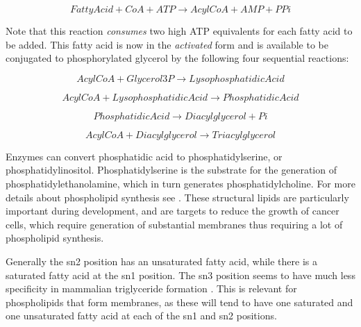 \documentclass{tufte-handout}
\begin{document}
\begin{equation}
Fatty Acid + CoA +  ATP \rightarrow AcylCoA + AMP + PPi
\end{equation}

Note that this reaction \emph{consumes} two high ATP equivalents for each fatty acid to be added.  This fatty acid is now in the \emph{activated} form and is available to be conjugated to phosphorylated glycerol by the following four sequential reactions:

\begin{equation}\label{eq:gpat}
AcylCoA + Glycerol3P \rightarrow Lysophosphatidic Acid
\end{equation}

\begin{equation}\label{eq:agpat}
AcylCoA+ Lysophosphatidic Acid \rightarrow Phosphatidic Acid
\end{equation}

\begin{equation}\label{eq:lipin}
Phosphatidic Acid \rightarrow Diacylglycerol + Pi
\end{equation}

\begin{equation}\label{eq:dgat}
AcylCoA + Diacylglycerol \rightarrow Triacylglycerol
\end{equation}

  Enzymes can convert phosphatidic acid to phosphatidylserine, or phosphatidylinositol.  Phosphatidylserine is the substrate for the generation of phosphatidylethanolamine, which in turn generates phosphatidylcholine.  For more details about phospholipid synthesis see \citet{Kent1995}.  These structural lipids are particularly important during development, and are targets to reduce the growth of cancer cells, which require generation of substantial membranes thus requiring a lot of phospholipid synthesis.  

  Generally the sn2 position has an unsaturated fatty acid, while there is a saturated fatty acid at the sn1 position.  The sn3 position seems to have much less specificity in mammalian triglyceride formation \citep{Brockerhoff1971}.  This is relevant for phospholipids that form membranes, as these will tend to have one saturated and one unsaturated fatty acid at each of the sn1 and sn2 positions.  
\end{document}
